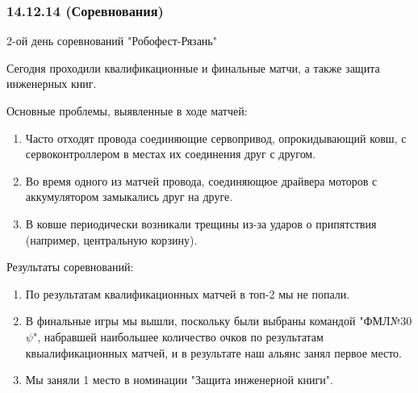 \subsubsection{14.12.14 (Соревнования)}
\begin{center}
	2-ой день соревнований "Робофест-Рязань"
\end{center}
Сегодня проходили квалификационные и финальные матчи, а также защита инженерных книг.
\newline 

Основные проблемы, выявленные в ходе матчей:
\begin{enumerate}
	\item Часто отходят провода соединяющие сервопривод, опрокидывающий ковш, с сервоконтроллером в местах их соединения друг с другом.
	
	\item Во время одного из матчей провода, соединяющюе драйвера моторов с аккумулятором замыкались друг на друге.
	
	\item В ковше периодически возникали трещины из-за ударов о припятствия (например, центральную корзину).
	
\end{enumerate}

Результаты соревнований:
\begin{enumerate}
	\item По результатам квалификационных матчей в топ-2 мы не попали.
	
	\item В финальные игры мы вышли, поскольку были выбраны командой "ФМЛ№30 ${\psi}$", набравшей наибольшее количество очков по результатам квыалификационных матчей, и в результате наш альянс занял первое место.
	
	\item Мы заняли 1 место в номинации "Защита инженерной книги".
\end{enumerate}

